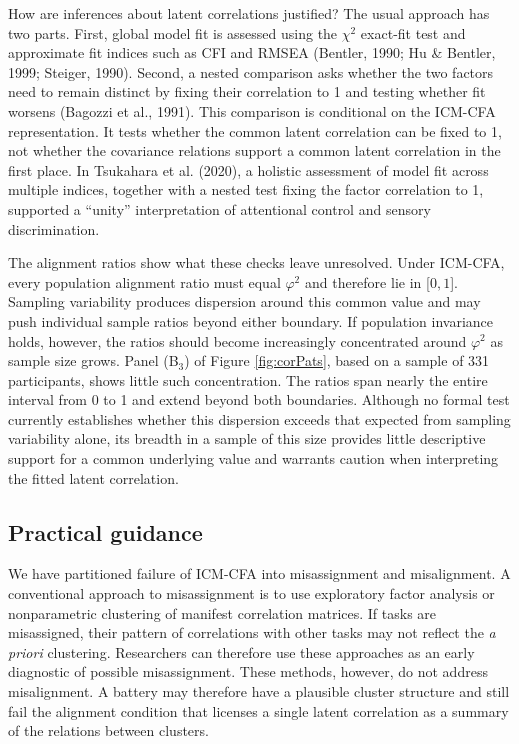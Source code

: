\documentclass[
  american,
  man,floatsintext]{apa7}
\begin{document}
How are inferences about latent correlations justified? The usual approach has two parts. First, global model fit is assessed using the \(\chi^2\) exact-fit test and approximate fit indices such as CFI and RMSEA (Bentler, 1990; Hu \& Bentler, 1999; Steiger, 1990). Second, a nested comparison asks whether the two factors need to remain distinct by fixing their correlation to 1 and testing whether fit worsens (Bagozzi et al., 1991). This comparison is conditional on the ICM-CFA representation. It tests whether the common latent correlation can be fixed to 1, not whether the covariance relations support a common latent correlation in the first place. In Tsukahara et al. (2020), a holistic assessment of model fit across multiple indices, together with a nested test fixing the factor correlation to 1, supported a ``unity'' interpretation of attentional control and sensory discrimination.

The alignment ratios show what these checks leave unresolved. Under ICM-CFA, every population alignment ratio must equal \(\varphi^2\) and therefore lie in {[}\(0,1\){]}. Sampling variability produces dispersion around this common value and may push individual sample ratios beyond either boundary. If population invariance holds, however, the ratios should become increasingly concentrated around \(\varphi^2\) as sample size grows. Panel (B\(_3\)) of Figure \ref{fig:corPats}, based on a sample of 331 participants, shows little such concentration. The ratios span nearly the entire interval from 0 to 1 and extend beyond both boundaries. Although no formal test currently establishes whether this dispersion exceeds that expected from sampling variability alone, its breadth in a sample of this size provides little descriptive support for a common underlying value and warrants caution when interpreting the fitted latent correlation.

\subsection{Practical guidance}\label{practical-guidance}

We have partitioned failure of ICM-CFA into misassignment and misalignment. A conventional approach to misassignment is to use exploratory factor analysis or nonparametric clustering of manifest correlation matrices. If tasks are misassigned, their pattern of correlations with other tasks may not reflect the \emph{a priori} clustering. Researchers can therefore use these approaches as an early diagnostic of possible misassignment. These methods, however, do not address misalignment. A battery may therefore have a plausible cluster structure and still fail the alignment condition that licenses a single latent correlation as a summary of the relations between clusters.
\end{document}
